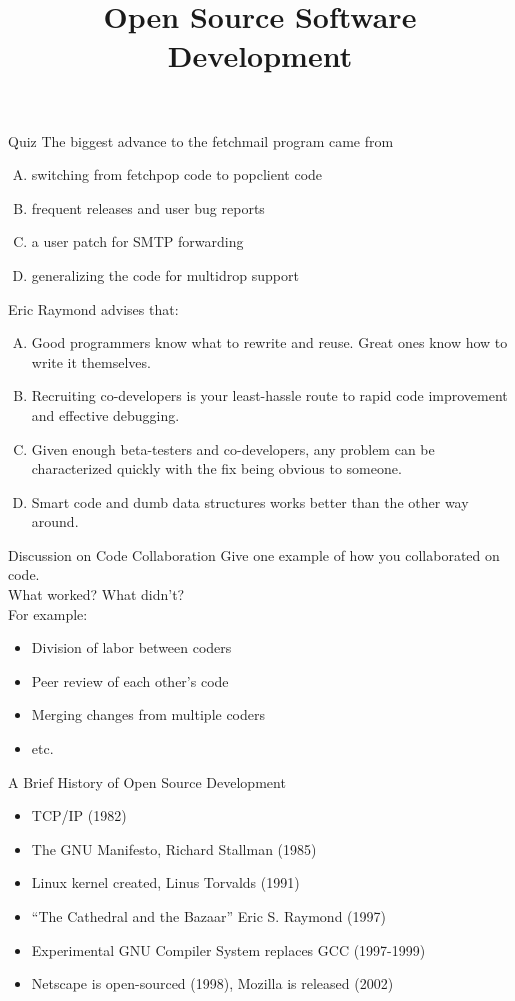 \documentclass{beamer}
\title{Open Source Software Development}
\date{}
\begin{document}
\begin{frame}
\titlepage
\end{frame}

\begin{frame}{Quiz}
The biggest advance to the fetchmail program came from
\begin{enumerate}[(A)]
\item<1> switching from fetchpop code to popclient code
\item<1> frequent releases and user bug reports
\item<1-2> a user patch for SMTP forwarding
\item<1> generalizing the code for multidrop support
\end{enumerate}
\medskip
Eric Raymond advises that:
\begin{enumerate}[(A)]
\item<1> Good programmers know what to rewrite and reuse. Great ones know how to write it themselves.
\item<1> Recruiting co-developers is your least-hassle route to rapid code improvement and effective debugging.
\item<1-2> Given enough beta-testers and co-developers, any problem can be characterized quickly with the fix being obvious to someone.
\item<1>  Smart code and dumb data structures works better than the other way around.
\end{enumerate}
\end{frame}

\begin{frame}{Discussion on Code Collaboration}
Give one example of how you collaborated on code.\\
\bigskip
\bigskip
What worked? What didn't?\\
\bigskip
\bigskip
\pause
For example:
\begin{itemize}
\item Division of labor between coders
\item Peer review of each other's code
\item Merging changes from multiple coders
\item etc.
\end{itemize}
\end{frame}

\begin{frame}{A Brief History of Open Source Development}
\begin{itemize}
\item TCP/IP (1982)
\item The GNU Manifesto, Richard Stallman (1985)
\item Linux kernel created, Linus Torvalds (1991)
\item ``The Cathedral and the Bazaar'' Eric S. Raymond (1997)
\item Experimental GNU Compiler System replaces GCC (1997-1999)
\item Netscape is open-sourced (1998), Mozilla is released (2002)
\end{itemize}
\end{frame}
\end{document}
